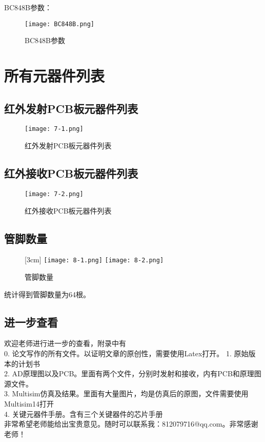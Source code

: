 BC848B参数：
\begin{figure}[H] %
    \centering
    \texttt{[image: BC848B.png]}
    \caption{BC848B参数}
    \label{fig:xfig1}
 \end{figure}
\section{所有元器件列表}
\subsection{红外发射PCB板元器件列表}
\begin{figure}[H] %
    \centering
    \texttt{[image: 7-1.png]}
    \caption{红外发射PCB板元器件列表}
    \label{fig:xfig1}
 \end{figure}
\subsection{红外接收PCB板元器件列表}
\begin{figure}[H] %
    \centering
    \texttt{[image: 7-2.png]}
    \caption{红外接收PCB板元器件列表}
    \label{fig:xfig1}
 \end{figure}

 \subsection{管脚数量}
 \begin{figure}[H]
    \centering%
    [3cm] %
      {\texttt{[image: 8-1.png]}}%
    \hspace{4em}%
        {\texttt{[image: 8-2.png]}}
    \caption{管脚数量}
    \label{fig:big1-subcaptionbox}
  \end{figure}
统计得到管脚数量为64根。

\subsection{进一步查看}

欢迎老师进行进一步的查看，附录中有\\

0. 论文写作的所有文件。以证明文章的原创性，需要使用Latex打开。
1. 原始版本的计划书\\
2. AD原理图以及PCB。里面有两个文件，分别时发射和接收，内有PCB和原理图源文件。\\
3. Multisim仿真及结果。里面有大量图片，均是仿真后的原图，文件需要使用Multisim14打开\\
4. 关键元器件手册。含有三个关键器件的芯片手册\\
非常希望老师能给出宝贵意见。随时可以联系我：812079716@qq.com。非常感谢老师！
